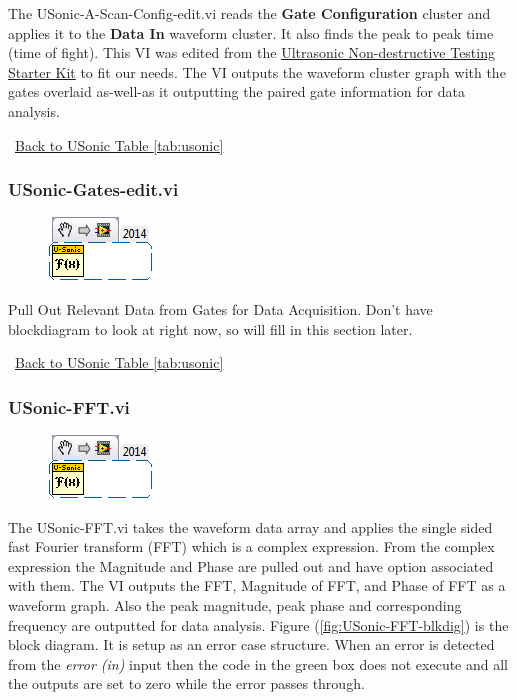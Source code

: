 \documentclass[11pt,a4paper,oldfontcommands]{memoir}
\begin{document}
The USonic-A-Scan-Config-edit.vi reads the \textbf {Gate Configuration} cluster and applies it to the \textbf{Data In} waveform cluster. It also finds the peak to peak time (time of fight). This VI was edited from the \href{http://www.ni.com/example/28618/en/}{Ultrasonic Non-destructive Testing Starter Kit} to fit our needs. The VI outputs the waveform cluster graph with the gates overlaid as-well-as it outputting the paired gate information for data analysis.

\noindent\hrulefill\, \hyperref[tab:usonic]{Back to USonic Table \ref{tab:usonic}}

\subsubsection{USonic-Gates-edit.vi} \label{USonic-Gates}
\noindent\hrulefill

\begin{figure}[h]
	\includegraphics[scale=0.625]{USonic-FFT_main_01}
	\label{fig:USonic-Gates-edit_main_01}
\end{figure}

Pull Out Relevant Data from Gates for Data Acquisition. Don't have blockdiagram to look at right now, so will fill in this section later.

\noindent\hrulefill\, \hyperref[tab:usonic]{Back to USonic Table \ref{tab:usonic}}

\subsubsection{USonic-FFT.vi} \label{USonic-FFT}
\noindent\hrulefill

\begin{figure}[h]
	\includegraphics[scale=0.625]{USonic-FFT_main_01}
	\label{fig:USonic-FFT_main_01}
\end{figure}

The USonic-FFT.vi takes the waveform data array and applies the single sided fast Fourier transform (FFT) which is a complex expression. From the complex expression the Magnitude and Phase are pulled out and have option associated with them. The VI outputs the FFT, Magnitude of FFT, and Phase of FFT as a waveform graph. Also the peak magnitude, peak phase and corresponding frequency are outputted for data analysis. Figure (\ref{fig:USonic-FFT-blkdig}) is the block diagram.  It is setup as an error case structure. When an error is detected from the \textit{error (in)} input then the code in the green box does not execute and all the outputs are set to zero while the error passes through.
\end{document}

